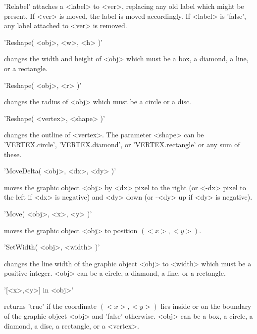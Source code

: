'Relabel'  attaches  a <label> to  <ver>, replacing  any old  label which
might be present.  If <ver> is moved, the label is moved accordingly.  If
<label> is 'false', any label attached to <ver> is removed.



'Reshape( <obj>, <w>, <h> )'

changes the width and height of  <obj> which must  be a box, a diamond, a
line, or a rectangle.

'Reshape( <obj>, <r> )'

changes the radius of <obj> which must be a circle or a disc.

'Reshape( <vertex>, <shape> )'

changes   the outline  of   <vertex>.  The   parameter  <shape>   can  be
'VERTEX.circle', 'VERTEX.diamond', or  'VERTEX.rectangle' or  any sum  of
these.


'MoveDelta( <obj>, <dx>, <dy> )'

moves the graphic object <obj> by <dx> pixel to the right (or <-dx> pixel
to the left if <dx>  is negative) and <dy> down  (or -<dy> up if <dy>  is
negative).


'Move( <obj>, <x>, <y> )'

moves the graphic object <obj> to position $(<x>,<y>)$.


'SetWidth( <obj>, <width> )'

changes the line width of the graphic  object <obj> to <width> which must
be a positive integer.   <obj> can be a circle,  a diamond, a line, or  a
rectangle.


'[<x>,<y>] in <obj>'

returns 'true'   if the  coordinate  $(<x>,<y>)$  lies  inside or  on the
boundary of the graphic object <obj> and 'false' otherwise.  <obj> can be
a box, a circle, a diamond, a disc, a rectangle, or a <vertex>.


